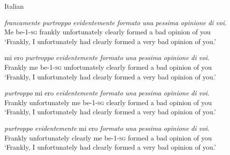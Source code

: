 \begin{exe} 
\ex Italian \citep[49]{cinque1999adverbs}\label{finiteauxcinque} \begin{xlist} 
\ex {} {\textit{francamente}} {\textit{purtroppo}} {\textit{evidentemente}} {\textit{formato}} {\textit{una}} {\textit{pessima}} {\textit{opinione}} {\textit{di}} {\textit{voi}.}  \\
{Me be-1-\textsc{sg}} {frankly} {unfortunately} {clearly} {formed} {a} {bad} {opinion} {of} {you} \\
\trans `Frankly, I unfortunately had clearly formed a very bad opinion of you.' \label{finiteauxcinquea}

\ex {} {mi ero} {\textit{purtroppo}} {\textit{evidentemente}} {\textit{formato}} {\textit{una}} {\textit{pessima}} {\textit{opinione}} {\textit{di}} {\textit{voi}.}  \\
 {Frankly} {me be-1-\textsc{sg}} {unfortunately} {clearly} {formed} {a} {bad} {opinion} {of} {you} \\
\trans `Frankly, I unfortunately had clearly formed a very bad opinion of you.' \label{finiteauxcinqueb}

\ex {}  {\textit{purtroppo}} {mi ero} {\textit{evidentemente}} {\textit{formato}} {\textit{una}} {\textit{pessima}} {\textit{opinione}} {\textit{di}} {\textit{voi}.}  \\
 {Frankly}  {unfortunately} {me be-1-\textsc{sg}} {clearly} {formed} {a} {bad} {opinion} {of} {you} \\
\trans `Frankly, I unfortunately had clearly formed a very bad opinion of you.' \label{finiteauxcinquec}

\ex {}  {\textit{purtroppo}}  {\textit{evidentemente}} {mi ero} {\textit{formato}} {\textit{una}} {\textit{pessima}} {\textit{opinione}} {\textit{di}} {\textit{voi}.}  \\
 {Frankly}  {unfortunately}  {clearly} {me be-1-\textsc{sg}} {formed} {a} {bad} {opinion} {of} {you} \\
\trans `Frankly, I unfortunately had clearly formed a very bad opinion of you.' \label{finiteauxcinqued}

\end{xlist} 
\end{exe}

